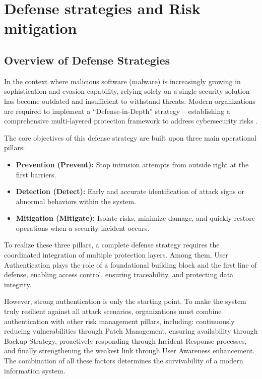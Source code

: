 \section{Defense strategies and Risk mitigation}

\subsection{Overview of Defense Strategies}

In the context where malicious software (malware) is increasingly growing in sophistication and evasion capability, relying solely on a single security solution has become outdated and insufficient to withstand threats. Modern organizations are required to implement a ``Defense-in-Depth'' strategy – establishing a comprehensive multi-layered protection framework to address cybersecurity risks \cite{kim2018fundamentals}.

The core objectives of this defense strategy are built upon three main operational pillars:

\begin{itemize}
    \item \textbf{Prevention (Prevent):} Stop intrusion attempts from outside right at the first barriers.
    \item \textbf{Detection (Detect):} Early and accurate identification of attack signs or abnormal behaviors within the system.
    \item \textbf{Mitigation (Mitigate):} Isolate risks, minimize damage, and quickly restore operations when a security incident occurs.
\end{itemize}

To realize these three pillars, a complete defense strategy requires the coordinated integration of multiple protection layers. Among them, User Authentication plays the role of a foundational building block and the first line of defense, enabling access control, ensuring traceability, and protecting data integrity.

However, strong authentication is only the starting point. To make the system truly resilient against all attack scenarios, organizations must combine authentication with other risk management pillars, including: continuously reducing vulnerabilities through Patch Management, ensuring availability through Backup Strategy, proactively responding through Incident Response processes, and finally strengthening the weakest link through User Awareness enhancement. The combination of all these factors determines the survivability of a modern information system.


